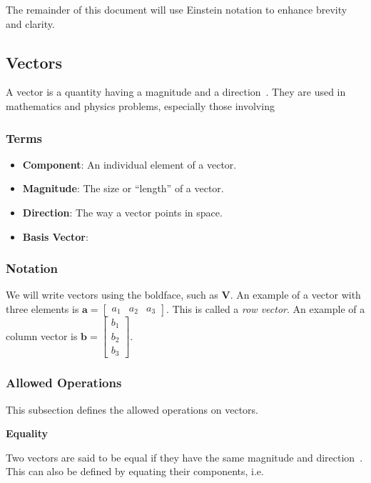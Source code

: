 \documentclass[12pt]{article}
\begin{document}
The remainder of this document will use Einstein notation to enhance brevity and clarity.

\subsection{Vectors}
A vector is a quantity having a magnitude and a direction~\cite{Wikipedia_Vectors_2024}.
They are used in mathematics and physics problems, especially those involving 

\subsubsection{Terms}
\begin{itemize}
\item \textbf{Component}: An individual element of a vector.
\item \textbf{Magnitude}: The size or ``length'' of a vector.
\item \textbf{Direction}: The way a vector points in space.
\item \textbf{Basis Vector}: 
\end{itemize}

\subsubsection{Notation}
We will write vectors using the boldface, such as $\mathbf{V}$. An example of a vector with 
three elements is $\mathbf{a} = \begin{bmatrix}a_1 & a_2 & a_3 \end{bmatrix}$. This is
called a \textit{row vector}. An example of a column vector is $\mathbf{b} = 
\begin{bmatrix}b_1 \\ b_2 \\ b_3 \end{bmatrix}$.

\subsubsection{Allowed Operations} 

This subsection defines the allowed operations on vectors.

\noindent \textbf{Equality}

Two vectors are said to be equal if they have the same magnitude and 
direction~\citep{Wikipedia_EuclidVectors_2025}. This can also be defined by
equating their components, i.e. 
\end{document}
